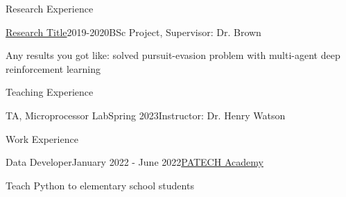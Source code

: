 \documentclass{resume} %
\begin{document}
    \begin{rSection}{Research Experience}
        \begin{rSubsection}{\href{https://link_to_your_research.com}{\textcolor{coolblack}{Research Title}}}{2019-2020}{BSc Project, Supervisor: Dr. Brown}{ }
            \item Any results you got like: solved pursuit-evasion problem with multi-agent deep reinforcement learning
        \end{rSubsection}
    \end{rSection}

	\begin{rSection}{Teaching Experience}
		\begin{rSubsection}{TA, Microprocessor Lab}{Spring 2023}{Instructor: Dr. Henry Watson}{}
		\end{rSubsection}
	\end{rSection}

    \begin{rSection}{Work Experience}
        \begin{rSubsection}{Data Developer}{January 2022 - June 2022}{\href{https://patech.ir}{\textcolor{coolblack}{PATECH Academy}}}{ }
            \item Teach Python to elementary school students
        \end{rSubsection}
    \end{rSection}
\end{document}
